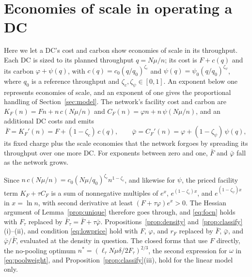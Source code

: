 \documentclass[11pt]{article}
\numberwithin{proposition}{section}
\theoremstyle{definition}
\theoremstyle{remark}
\theoremstyle{plain}
\begin{document}
\section{Economies of scale in operating a DC}\label{app:scale}

Here we let a DC's cost and carbon show economies of scale in its throughput. Each DC is sized to its planned
throughput $q=N\mu/n$; its cost is $F+c(q)$ and its carbon $\varphi+\psi(q)$, with $c(q)=c_0(q/q_0)^{\zeta_c}$ and
$\psi(q)=\psi_0(q/q_0)^{\zeta_\psi}$, where $q_0$ is a reference throughput and $\zeta_c,\zeta_\psi\in[0,1]$. An
exponent below one represents economies of scale, and an exponent of one gives the proportional handling of
Section~\ref{sec:model}. The network's
facility cost and carbon are $K_F(n)=Fn+n\,c(N\mu/n)$ and $C_F(n)=\varphi n+n\,\psi(N\mu/n)$, and an additional
DC costs and emits
\[
  \bar F=K_F'(n)=F+(1-\zeta_c)\,c(q),\qquad \bar\varphi=C_F'(n)=\varphi+(1-\zeta_\psi)\,\psi(q),
\]
its fixed charge plus the scale economies that the network forgoes by spreading its throughput over one more
DC. For exponents between zero and one, $\bar F$ and $\bar\varphi$ fall as the network grows.

Since $n\,c(N\mu/n)=c_0(N\mu/q_0)^{\zeta_c}n^{1-\zeta_c}$, and likewise for $\psi$, the priced facility term
$K_F+\tau C_F$ is a sum of nonnegative multiples of $e^{x}$, $e^{(1-\zeta_c)x}$, and $e^{(1-\zeta_\psi)x}$ in
$x=\ln n$, with second derivative at least $(F+\tau\varphi)e^{x}>0$. The Hessian argument of
Lemma~\ref{prop:unique} therefore goes through, and \eqref{eq:focn} holds with $F_\tau$ replaced by
$\bar F_\tau=\bar F+\tau\bar\varphi$. Propositions~\ref{prop:density} and~\ref{prop:classify}(i)--(ii), and condition
\eqref{eq:lowprice} hold with $F$, $\varphi$, and $r_F$ replaced by $\bar F$,
$\bar\varphi$, and $\bar\varphi/\bar F$, evaluated at the density in question. The closed forms that use $F$
directly, the no-pooling optimum $n^*=(\ell_\tau N\mu\delta/2F_\tau)^{2/3}$, the second expression for $\omega$ in
\eqref{eq:poolweight}, and Proposition~\ref{prop:classify}(iii), hold for the linear model only.
\end{document}
